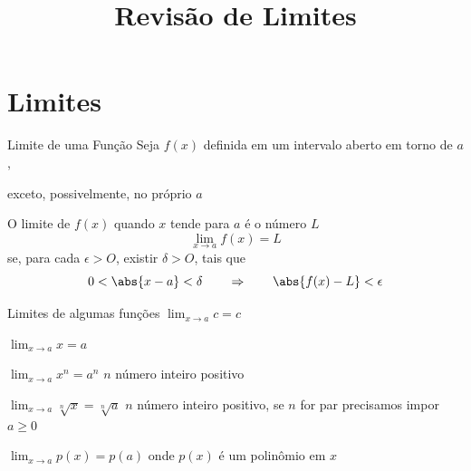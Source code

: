 \documentclass[fleqn,utf8,aspectratio=169,12pt,ignorenonframetext]{beamer}
\title{Revisão de Limites}
\begin{document}
\addtitle

\section{Limites}

\begin{frame}{Limite de uma Função}
  Seja $f(x)$ definida em um intervalo aberto em torno de $a$,

  \pause
  exceto, possivelmente, no próprio $a$

  \pause
  O limite de $f(x)$ quando $x$ tende para $a$ é o número $L$
  \[
    \lim_{x\to a} f(x) = L
  \]
  \pause
  se, para cada \(\epsilon > O\), existir \(\delta > O\), tais que
  \pause
  \[
    0 < \abs{x-a} < \delta \qquad\Rightarrow\qquad \abs{f(x)-L} < \epsilon
  \]
\end{frame}



\begin{frame}{Limites de algumas funções}
  \( \lim_{x\to a} c = c \)

  \pause
  \vspace{0.5\baselineskip}
  \( \lim_{x\to a} x = a \)

  \pause
  \vspace{0.5\baselineskip}
  \( \lim_{x\to a} x^n = a^n \)
  \tabto{35mm}
  $n$ número inteiro positivo

  \pause
  \vspace{0.5\baselineskip}
  \( \lim_{x\to a} \sqrt[n]{x} = \sqrt[n]{a} \)
  \tabto{35mm}
  $n$ número inteiro positivo, se $n$ for par precisamos impor $a\geq 0$

  \pause
  \vspace{0.5\baselineskip}
  \( \lim_{x\to a} p(x) = p(a) \)
  \tabto{35mm}
  onde $p(x)$ é um polinômio em $x$
\end{frame}
\end{document}
